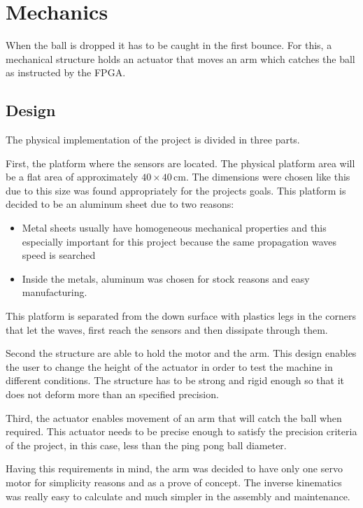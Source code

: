 \chapter{Mechanics} %
\label{chap:mechanics}
	When the ball is dropped it has to be caught in the first bounce. 
	For this, a mechanical structure holds an actuator that moves an arm which catches the ball as instructed by the FPGA.

	\section{Design} %
	\label{sec:mechanics_design}
		The physical implementation of the project is divided in three parts.

		First, the platform where the sensors are located. 
		The physical platform area will be a flat area of approximately $40\times40\,\si{\centi\meter}$.
		The dimensions were chosen like this due to this size was found appropriately for the projects goals. 
		This platform is decided to be an aluminum sheet due to two reasons: 
		\begin{itemize}
			\item Metal sheets usually have homogeneous mechanical properties and this especially important for this project because the same propagation waves speed is searched
			\item Inside the metals, aluminum was chosen for stock reasons and easy manufacturing. 
		\end{itemize}
		This platform is separated from the down surface with plastics legs in the corners that let the waves, first reach the sensors and then dissipate through them.

		Second the structure are able to hold the motor and the arm. This design enables the user to change the height of the actuator in order to test the machine in different conditions. 
		The structure has to be strong and rigid enough so that it does not deform more than an specified precision.

		Third, the actuator enables movement of an arm that will catch the ball when required. 
		This actuator needs to be precise enough to satisfy the precision criteria of the project, in this case, less than the ping pong ball diameter. 
			
		Having this requirements in mind, the arm was decided to have only one servo motor for simplicity reasons and as a prove of concept. 
		The inverse kinematics was really easy to calculate and much simpler in the assembly and maintenance.
	
